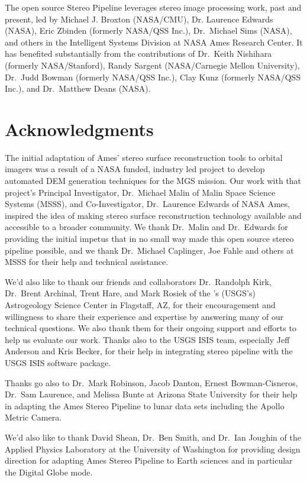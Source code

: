 The open source Stereo Pipeline leverages stereo image processing
work, past and present, led by Michael J. Broxton (NASA/CMU),
Dr. Laurence Edwards (NASA), Eric Zbinden (formerly NASA/QSS Inc.),
Dr.~Michael Sims (NASA), and others in the Intelligent Systems
Division at NASA Ames Research Center. It has benefited substantially
from the contributions of Dr.~Keith Nishihara (formerly
NASA/Stanford), Randy Sargent (NASA/Carnegie Mellon University),
Dr.~Judd Bowman (formerly NASA/QSS Inc.), Clay Kunz (formerly NASA/QSS
Inc.), and Dr.~Matthew Deans (NASA).

\section*{Acknowledgments}

The initial adaptation of Ames' stereo surface reconstruction tools to
orbital imagers was a result of a NASA funded, industry led project to
develop automated \ac{DEM} generation techniques for
the \ac{MGS} mission. Our work with that project's
Principal Investigator, Dr.~Michael Malin of Malin Space Science
Systems (MSSS), and Co-Investigator, Dr.~Laurence Edwards of NASA
Ames, inspired the idea of making stereo surface reconstruction
technology available and accessible to a broader community.  We thank
Dr.~Malin and Dr.~Edwards for providing the initial impetus that in no
small way made this open source stereo pipeline possible, and we thank
Dr.~Michael Caplinger, Joe Fahle and others at MSSS for their help and
technical assistance.

We'd also like to thank our friends and collaborators Dr.~Randolph
Kirk, Dr.~Brent Archinal, Trent Hare, and Mark Rosiek of the
's (\acs{USGS}'s) Astrogeology Science Center in Flagstaff,
AZ, for their encouragement and willingness to share their experience
and expertise by answering many of our technical questions.  We also
thank them for their ongoing support and efforts to help us evaluate
our work.  Thanks also to the \ac{USGS} \ac{ISIS} team, especially
Jeff Anderson and Kris Becker, for their help in integrating stereo
pipeline with the \ac{USGS} \ac{ISIS} software package.

Thanks go also to Dr.~Mark Robinson, Jacob Danton, Ernest
Bowman-Cisneros, Dr.~Sam Laurence, and Melissa Bunte at Arizona State
University for their help in adapting the Ames Stereo Pipeline to
lunar data sets including the Apollo Metric Camera.

We'd also like to thank David Shean, Dr.~Ben Smith, and Dr.~Ian
Joughin of the Applied Physics Laboratory at the University of
Washington for providing design direction for adapting Ames Stereo
Pipeline to Earth sciences and in particular the Digital Globe mode.

